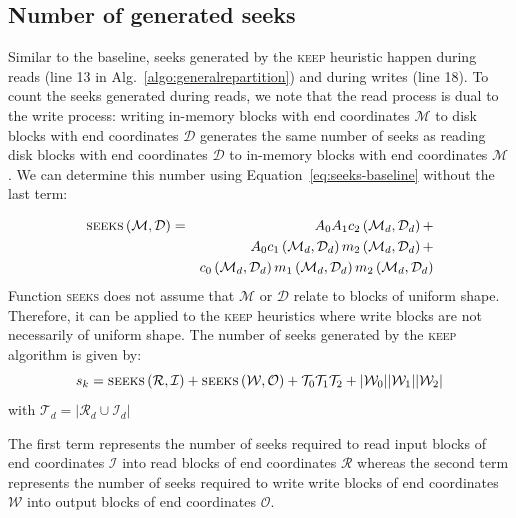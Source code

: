 \documentclass[sigconf, nonacm]{acmart}
\newcommand{\keep}[0]{\textsc{keep}\xspace}
\begin{document}
\subsection{Number of generated seeks}
Similar to the
baseline, seeks generated by the \keep heuristic happen during reads (line
13 in Alg.~\ref{algo:generalrepartition}) and during writes (line 18).  To count the seeks generated
during reads, we note that the read process is dual to the write process:
writing in-memory blocks with end coordinates $\mathcal{M}$ to disk blocks
with end coordinates $\mathcal{D}$ generates the same number of seeks as
reading disk blocks with end coordinates $\mathcal{D}$ to in-memory blocks
with end coordinates $\mathcal{M}$.
We can determine this number using Equation~\ref{eq:seeks-baseline} without the last term:

\begin{eqnarray*}
  \textsc{seeks} \left(  \mathcal{M}, \mathcal{D} \right) &=&  A_0 A_1 c_2\left(\mathcal{M}_d, \mathcal{D}_d\right) + \\
                                                         &&  A_0 c_1\left(\mathcal{M}_d, \mathcal{D}_d\right) m_2\left(\mathcal{M}_d, \mathcal{D}_d\right) +\\
                                                         && c_0\left(\mathcal{M}_d, \mathcal{D}_d\right) m_1\left(\mathcal{M}_d, \mathcal{D}_d\right) m_2\left(\mathcal{M}_d, \mathcal{D}_d \right)
\end{eqnarray*}
Function
\textsc{seeks} does not assume that $\mathcal{M}$ or $\mathcal{D}$ relate to
blocks of uniform shape. Therefore, it can be applied to the \keep
heuristics where write blocks are not necessarily of uniform shape.
The number of seeks generated by the \keep algorithm is given by:
\begin{equation}
  s_k = \textsc{seeks} \left(  \mathcal{R}, \mathcal{I} \right) + \textsc{seeks} \left( \mathcal{W}, \mathcal{O} \right) + \mathcal{T}_0\mathcal{T}_1\mathcal{T}_2 + \vert \mathcal{W}_0 \vert  \vert \mathcal{W}_1 \vert \vert \mathcal{W}_2 \vert \label{eq:seeks-keep}
\end{equation}
with $ \mathcal{T}_d = \vert \mathcal{R}_d \cup \mathcal{I}_d \vert$

The first term represents the number of seeks required to read input
 blocks of end coordinates $\mathcal{I}$ into read blocks of end
 coordinates $\mathcal{R}$ whereas the second term represents the number of
 seeks required to write write blocks of end coordinates $\mathcal{W}$ into
 output blocks of end coordinates $\mathcal{O}$.
\end{document}
